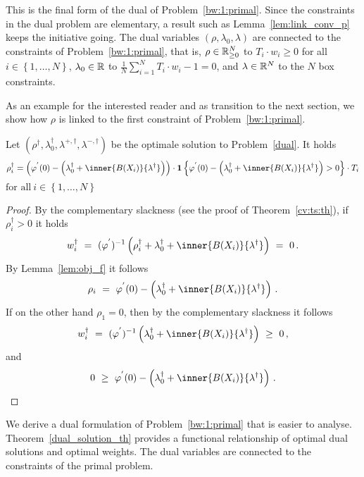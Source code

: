 \begin{remark}
  This is the final form of the dual of Problem~\ref{bw:1:primal}.
  Since the constraints in the dual problem are elementary,
  a result such as Lemma~\ref{lem:link_conv_p}
  keeps the initiative going.
  The dual variables $(\rho,\lambda_0,\lambda)$ are connected to the constraints of Problem~\ref{bw:1:primal}, that is,
  $\rho\in\mathbb{R}^N_{\ge 0}$
  to
  $T_i\cdot w_i\ge 0$ for all $i\in \left\{ 1,\ldots,N \right\}$,
  $\lambda_0\in\mathbb{R}$ 
  to 
  $
  \frac{1}{N}
  \sum_{i=1}^{N} 
  T_i\cdot w_i
  -
  1
  =
  0
  $,
  and
  $\lambda\in\mathbb{R}^N$ to the $N$ box constraints.
\end{remark}
As an example for the interested reader and as transition to the next section, we show how $\rho$ is linked to the first constraint of Problem~\ref{bw:1:primal}. 
\begin{lemma}
  Let 
$
(\rho^\dagger,\lambda_0^\dagger,\lambda^{+,\dagger},\lambda^{-,\dagger})
$
be the optimale solution to Problem~\ref{dual}.
It holds
\begin{align*}
  \rho_i^\dagger
  =
  \left( 
  \varphi^{'}
  (0)
  -
  \left( 
    \lambda_0^\dagger + \inner{B(X_i)}{\lambda^\dagger}
  \right)
  \right)
  \cdot
  \mathbf{1}
  \left\{ 
  \varphi^{'}
  (0)
  -
  \left( 
    \lambda_0^\dagger + \inner{B(X_i)}{\lambda^\dagger}
  \right)
  >0
  \right\}
  \cdot T_i
\end{align*}
$
  \text{for all}\ i\in \left\{ 1,\ldots,N \right\}
$
\end{lemma}
\begin{proof}
  By the complementary slackness (see the proof of Theorem~\ref{cv:ts:th}), if $\rho_i^\dagger>0$ it holds
  \begin{align*}
    w_i^\dagger
    \ 
    =
    \ 
    (
    \varphi^{'}
    )^{-1}
\left( 
  \rho_i^\dagger
  +
    \lambda_0^\dagger + \inner{B(X_i)}{\lambda^\dagger}
\right)
    \ 
=
    \ 
0
\,.
  \end{align*}
  By Lemma~\ref{lem:obj_f} it follows
  \begin{align*}
    \rho_i
    \ 
    =
    \ 
    \varphi^{'}
    (0)
    -
    \left( 
    \lambda_0^\dagger + \inner{B(X_i)}{\lambda^\dagger}
    \right)
    \,.
  \end{align*}
  If on the other hand $\rho_1=0$, then by the complementary slackness it follows
  \begin{align*}
    w_i^\dagger
    \ 
    =
    \ 
    (
    \varphi^{'}
    )^{-1}
\left( 
    \lambda_0^\dagger + \inner{B(X_i)}{\lambda^\dagger}
\right)
    \ 
\ge 
    \ 
0
\,,
  \end{align*}
  and
  \begin{align*}
    0
    \ 
    \ge
    \ 
    \varphi^{'}
    (0)
    -
    \left( 
    \lambda_0^\dagger + \inner{B(X_i)}{\lambda^\dagger}
    \right)
    \,.
  \end{align*}
\end{proof}
\begin{takeaways}
  We derive a dual formulation of Problem~\ref{bw:1:primal} that is easier to analyse.
  Theorem~\ref{dual_solution_th} provides a functional relationship of optimal dual solutions and 
  optimal weights.
  The dual variables are connected to the constraints of the primal problem.
\end{takeaways}

